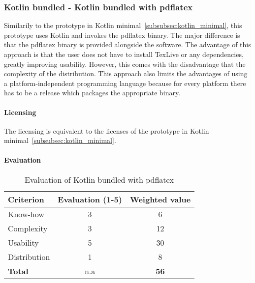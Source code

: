 \subsubsection{Kotlin bundled - Kotlin bundled with pdflatex}
\label{sec:kotlin_bundled}
Similarily to the prototype in Kotlin minimal~\ref{subsubsec:kotlin_minimal}, this prototype uses Kotlin and invokes the pdflatex binary.
The major difference is that the pdflatex binary is provided alongside
the software.
The advantage of this approach is that the user does not have to install TexLive or any dependencies, greatly improving usability.
However, this comes with the disadvantage
that the complexity of the distribution.
This approach also limits the advantages of using a platform-independent programming language because for every platform there has to be a release
which packages the appropriate binary.

\paragraph{Licensing}\mbox{}\newline
The licensing is equivalent to the licenses of the prototype in Kotlin minimal~\ref{subsubsec:kotlin_minimal}.

\paragraph{Evaluation}\mbox{}\newline
\begin{table}[H]
    \centering
    \begin{tabular}{|l|c|c|}
        \hline
        \textbf{Criterion} & \textbf{Evaluation (1-5)} & \textbf{Weighted value} \\
        \hline
        Know-how & 3 & 6 \\
        \hline
        Complexity & 3 & 12 \\
        \hline
        Usability & 5 & 30 \\
        \hline
        Distribution & 1 & 8 \\
        \hline
        \textbf{Total} & n.a & \textbf{56} \\
        \hline
    \end{tabular}
    \caption{Evaluation of Kotlin bundled with pdflatex}
    \label{table:kotlin_bundled_evaluation}
\end{table}

